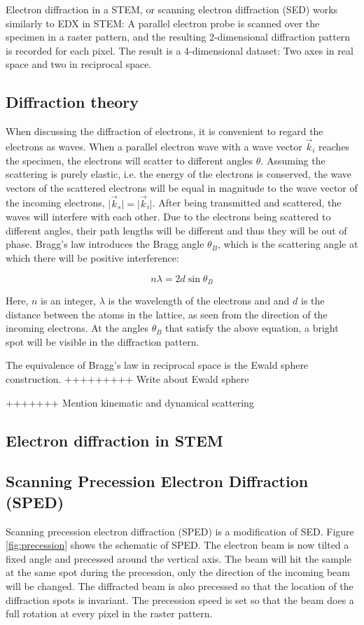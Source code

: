 Electron diffraction in a STEM, or scanning electron diffraction (SED) works similarly to EDX in STEM: A parallel electron probe is scanned over the specimen in a raster pattern, and the resulting 2-dimensional diffraction pattern is recorded for each pixel. The result is a 4-dimensional dataset: Two axes in real space and two in reciprocal space.

	\subsection{Diffraction theory}
When discussing the diffraction of electrons, it is convenient to regard the electrons as waves. When a parallel electron wave with a wave vector $\vec{k}_i$ reaches the specimen, the electrons will scatter to different angles $\theta$. Assuming the scattering is purely elastic, i.e. the energy of the electrons is conserved, the wave vectors of the scattered electrons will be equal in magnitude to the wave vector of the incoming electrons, $\vert \vec{k}_s \vert = \vert \vec{k}_i \vert$. After being transmitted and scattered, the waves will interfere with each other. Due to the electrons being scattered to different angles, their path lengths will be different and thus they will be out of phase. Bragg's law introduces the Bragg angle $\theta_B$, which is the scattering angle at which there will be positive interference:

\begin{equation}
\label{braggs law}
n\lambda = 2 d \sin \theta_B
\end{equation}

Here, $n$ is an integer, $\lambda$ is the wavelength of the electrons and and $d$ is the distance between the atoms in the lattice, as seen from the direction of the incoming electrons. At the angles $\theta_B$ that satisfy the above equation, a bright spot will be visible in the diffraction pattern.

The equivalence of Bragg's law in reciprocal space is the Ewald sphere construction. +++++++++ Write about Ewald sphere

+++++++ Mention kinematic and dynamical scattering


	\subsection{Electron diffraction in STEM}
	
	\subsection{Scanning Precession Electron Diffraction (SPED)}
Scanning precession electron diffraction (SPED) is a modification of SED. Figure \ref{fig:precession} shows the schematic of SPED. The electron beam is now tilted a fixed angle and precessed around the vertical axis. The beam will hit the sample at the same spot during the precession, only the direction of the incoming beam will be changed. The diffracted beam is also precessed so that the location of the diffraction spots is invariant. The precession speed is set so that the beam does a full rotation at every pixel in the raster pattern.

